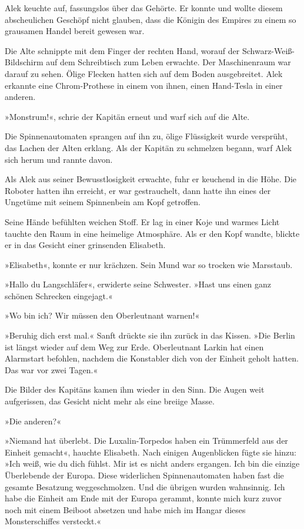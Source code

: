 Alek keuchte auf, fassungslos über das Gehörte. Er konnte und
wollte diesem abscheulichen Geschöpf nicht glauben, dass die
Königin des Empires zu einem so grausamen Handel bereit gewesen
war.

\bigpar

Die Alte schnippte mit dem Finger der rechten Hand, worauf der
Schwarz-Weiß-Bildschirm auf dem Schreibtisch zum Leben erwachte.
Der Maschinenraum war darauf zu sehen. Ölige Flecken hatten sich
auf dem Boden ausgebreitet. Alek erkannte eine Chrom-Prothese in
einem von ihnen, einen Hand-Tesla in einer anderen.

\bigpar

»Monstrum!«, schrie der Kapitän erneut und warf sich auf die Alte.

\bigpar

Die Spinnenautomaten sprangen auf ihn zu, ölige Flüssigkeit wurde
versprüht, das Lachen der Alten erklang. Als der Kapitän zu
schmelzen begann, warf Alek sich herum und rannte davon.

\tb

Als Alek aus seiner Bewusstlosigkeit erwachte, fuhr er keuchend in
die Höhe. Die Roboter hatten ihn erreicht, er war gestrauchelt,
dann hatte ihn eines der Ungetüme mit seinem Spinnenbein am Kopf
getroffen.

Seine Hände befühlten weichen Stoff. Er lag in einer Koje und
warmes Licht tauchte den Raum in eine heimelige Atmosphäre. Als er
den Kopf wandte, blickte er in das Gesicht einer grinsenden
Elisabeth.

\bigpar

»Elisabeth«, konnte er nur krächzen. Sein Mund war so trocken wie
Marsstaub.

»Hallo du Langschläfer«, erwiderte seine Schwester. »Hast uns einen
ganz schönen Schrecken eingejagt.«

»Wo bin ich? Wir müssen den Oberleutnant warnen!«

»Beruhig dich erst mal.« Sanft drückte sie ihn zurück in das
Kissen. »Die Berlin ist längst wieder auf dem Weg zur Erde.
Oberleutnant Larkin hat einen Alarmstart befohlen, nachdem die
Konstabler dich von der Einheit geholt hatten. Das war vor zwei
Tagen.«

Die Bilder des Kapitäns kamen ihm wieder in den Sinn. Die Augen
weit aufgerissen, das Gesicht nicht mehr als eine breiige Masse.

»Die anderen?«

»Niemand hat überlebt. Die Luxalin-Torpedos haben ein Trümmerfeld
aus der Einheit gemacht«, hauchte Elisabeth. Nach einigen
Augenblicken fügte sie hinzu: »Ich weiß, wie du dich fühlst. Mir
ist es nicht anders ergangen. Ich bin die einzige Überlebende der
Europa. Diese widerlichen Spinnenautomaten haben fast die gesamte
Besatzung weggeschmolzen. Und die übrigen wurden wahnsinnig. Ich
habe die Einheit am Ende mit der Europa gerammt, konnte mich kurz
zuvor noch mit einem Beiboot absetzen und habe mich im Hangar
dieses Monsterschiffes versteckt.«

